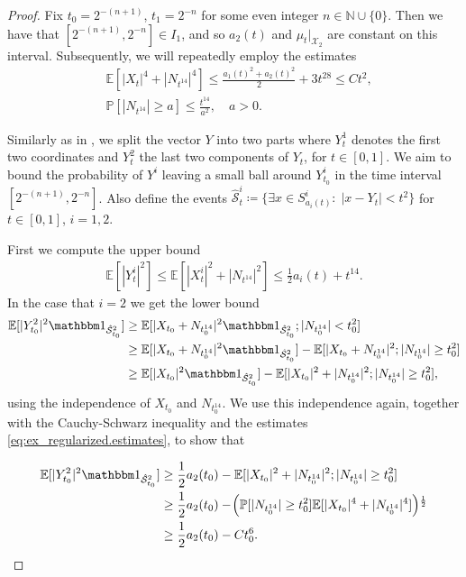 \documentclass[10pt,a4paper]{amsart}
\def\E{{\mathbb E}}
\def\P{{\mathbb P}}
\newcommand{\N}{\mathbb N}
\newcommand{\Scc}{\hat{\mathcal S}}
\newcommand{\X}{\mathcal X}
\begin{document}
\begin{proof}
	Fix $t_0 = 2^{-(n+1)}$, $t_1 = 2^{-n}$ for some even integer $n \in \N \cup \{ 0 \}$. Then we have that $[2^{-(n+1)}, 2^{-n}] \in I_1$, and so $a_2(t)$ and $\mu_t |_{\X_2}$ are constant on this interval.    
    Subsequently, we will repeatedly employ the estimates
    \begin{equation}\label{eq:ex_regularized.estimates}
    \begin{split}
        & \E[|X_t|^4 + |N_{t^{14}}|^4] \le \frac{a_1(t)^2 + a_2(t)^2}{2} + 3 t^{28} \le C t^2,\\
        & \P[|N_{t^{14}}| \ge a] \le \frac{t^{14}}{a^2}, \quad a > 0.
	\end{split}
    \end{equation}

	Similarly as in , we split the vector $Y$ into two parts where $Y^1_t$ denotes the first two coordinates and $Y^2_t$ the last two components of $Y_t$, for $t \in [0, 1]$. We aim to bound the probability of $Y^i$ leaving a small ball around $Y^i_{t_0}$ in the time interval $[2^{-(n +1)}, 2^{-n}]$.
	Also define the events $\Scc^i_{t} \coloneqq \{\exists x \in S^i_{a_i(t)} \colon \; |x - Y_t| < t^2\}$ for $t \in [0, 1]$, $i = 1,2$.
	
	First we compute the upper bound
    \begin{align}\label{eq:ex_regularized.ub}
        \E[|Y^i_t|^2] \le \E[|X_t^i|^2 + |N_{t^{14}}|^2] \le \frac12 a_i(t) + t^{14}.
    \end{align}
    In the case that $i = 2$ we get the lower bound
    \begin{align}
        \E[|Y_{t_0}^2|^2 \mathbbm 1_{\Scc_{t_0}^2}] & \ge  \E[|X_{t_0} + N_{t_0^{14}}|^2 \mathbbm 1_{\Scc_{t_0}^2}; |N_{t_0^{14}}| < t_0^2]\\
        &\ge
        \E[|X_{t_0} + N_{t_0^{14}} |^2\mathbbm 1_{\Scc_{t_0}^2}] - \E[|X_{t_0} + N_{t_0^{14}}|^2; |N_{t_0^{14}}| \ge t_0^2]
        \\
        &\ge \E[|X_{t_0}|^2\mathbbm 1_{\Scc_{t_0}^2}] - \E[|X_{t_0}|^2 + |N_{t_0^{14}}|^2; |N_{t_0^{14}}| \ge t_0^2],
    \end{align}
    using the independence of $X_{t_0}$ and $N_{t_0^{14}}$. We use this independence again, together with the Cauchy-Schwarz inequality and the estimates \eqref{eq:ex_regularized.estimates}, to show that
    
    \begin{align}
    	 \E[|Y_{t_0}^2|^2 \mathbbm 1_{\Scc_{t_0}^2}] &\ge \frac12 a_2(t_0) - \E[|X_{t_0}|^2 + |N_{t_0^{14}}|^2; |N_{t_0^{14}}| \ge t_0^2 ] \\
        &\ge \frac12 a_2(t_0) - \!\left(\P[|N_{t_0^{14}}| \ge t_0^2] \E[|X_{t_0}|^4 + |N_{t_0^{14}}|^4]\right)\!^\frac12
        \\
        &\ge \frac12 a_2(t_0) - C t_0^6.
    \end{align}
    

\end{proof}
\end{document}
